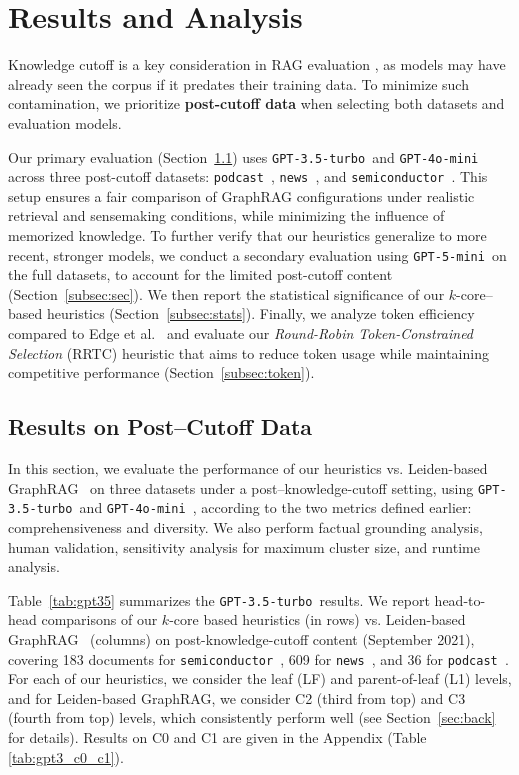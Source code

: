 \documentclass[sigconf]{acmart}
\newcommand{\threepointfive}{\texttt{GPT-3.5-turbo\,}}
\newcommand{\four}{\texttt{GPT-4o-mini\,}}
\newcommand{\five}{\texttt{GPT-5-mini\,}}
\newcommand{\podcast}{\texttt{podcast\,}}
\newcommand{\news}{\texttt{news\,}}
\newcommand{\semi}{\texttt{semiconductor\,}}
\begin{document}
\section{Results and Analysis} \label{sec:results_analysis}

Knowledge cutoff is a key consideration in RAG evaluation \cite{yang26, seo25}, as models may have already seen the corpus if it predates their training data. To minimize such contamination, we prioritize \textbf{post-cutoff data} when selecting both datasets and evaluation models. 

Our primary evaluation (Section~\ref{subsec:pri}) uses \threepointfive and \four
across three post-cutoff datasets: \podcast, \news, and \semi.
 This setup ensures a fair comparison of GraphRAG configurations under realistic retrieval and sensemaking conditions, while minimizing the influence of memorized knowledge.
To further verify that our heuristics generalize to more recent, stronger models, we conduct a secondary evaluation using \five on the full datasets, to account for the limited post-cutoff content (Section~\ref{subsec:sec}).
We then report the statistical significance of our $k$-core–based heuristics (Section~\ref{subsec:stats}). Finally, we analyze token efficiency compared to Edge et al.~\cite{edge24} and evaluate our \textit{Round-Robin Token-Constrained Selection} (RRTC) heuristic that aims to reduce token usage while maintaining competitive performance (Section~\ref{subsec:token}).

\subsection{Results on Post–Cutoff Data}\label{subsec:pri}

In this section, we evaluate the performance of our heuristics vs. Leiden-based GraphRAG~\cite{edge24} on three datasets under a post–knowledge-cutoff setting, using \threepointfive and \four, according to the two metrics defined earlier: {comprehensiveness} and {diversity}.
We also perform factual grounding analysis, human validation, sensitivity analysis for maximum cluster size, and runtime analysis. 

Table~\ref{tab:gpt35} summarizes the \threepointfive results.
We report head-to-head comparisons of our $k$-core based heuristics (in rows) vs. Leiden-based GraphRAG~\cite{edge24} (columns) on post-knowledge-cutoff content (September 2021), covering 183 documents for \semi, 609 for \news, and 36 for \podcast.
For each of our heuristics, we consider the leaf (LF) and parent-of-leaf (L1) levels, and for Leiden-based GraphRAG, we consider C2 (third from top) and C3 (fourth from top) levels, which consistently perform well (see Section~\ref{sec:back} for details).
 Results on C0 and C1 are given in the %
Appendix (Table \ref{tab:gpt3_c0_c1}).
\end{document}
